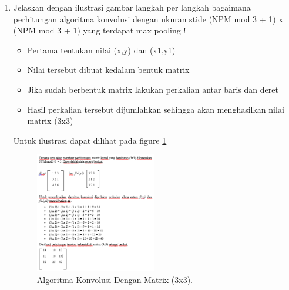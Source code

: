 \begin{enumerate}
\item Jelaskan dengan ilustrasi gambar langkah per langkah bagaimana perhitungan algoritma konvolusi dengan ukuran stide (NPM mod 3 + 1) x (NPM mod 3 + 1) yang terdapat max pooling !

	\begin{itemize}
		\item Pertama tentukan nilai (x,y) dan (x1,y1)
		\item Nilai tersebut dibuat kedalam bentuk matrix
		\item Jika sudah berbentuk matrix lakukan perkalian antar baris dan deret
		\item Hasil perkalian tersebut dijumlahkan sehingga akan menghasilkan nilai matrix (3x3)
	\end{itemize}

	\subitem Untuk ilustrasi dapat dilihat pada figure \ref{no13}

	\begin{figure}[!htbp!]
		\centerline{\includegraphics[width=0.5\textwidth]{figures/Chapter7/no13.png}}
		\caption{Algoritma Konvolusi Dengan Matrix (3x3).}
		\label{no13}
	\end{figure}	

\end{enumerate}





